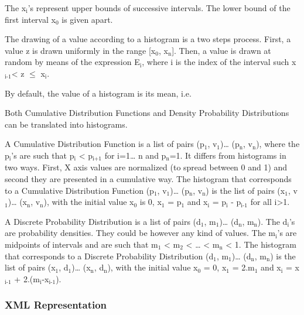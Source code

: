 \documentclass[11pt]{article}
\begin{document}
The x\(_{\text{i}}\)'s represent upper bounds of successive intervals. The lower
bound of the first interval x\(_{\text{0}}\) is given apart.

The drawing of a value according to a histogram is a two steps process.
First, a value z is drawn uniformly in the range [x\(_{\text{0}}\), x\(_{\text{n}}\)]. Then, a
value is drawn at random by means of the expression E\(_{\text{i}}\), where i is
the index of the interval such x\(_{\text{i-1}}\)< z \(\le\) x\(_{\text{i}}\).

By default, the value of a histogram is its mean, i.e.

Both Cumulative Distribution Functions and Density Probability
Distributions can be translated into histograms.

A Cumulative Distribution Function is a list of pairs (p\(_{\text{1}}\), v\(_{\text{1}}\))\ldots{}
(p\(_{\text{n}}\), v\(_{\text{n}}\)), where the p\(_{\text{i}}\)'s are such that p\(_{\text{i}}\) < p\(_{\text{i+1}}\) for
i=1\ldots{} n and p\(_{\text{n}}\)=1. It differs from histograms in two ways. First, X
axis values are normalized (to spread between 0 and 1) and second they
are presented in a cumulative way. The histogram that corresponds to a
Cumulative Distribution Function (p\(_{\text{1}}\), v\(_{\text{1}}\))\ldots{} (p\(_{\text{n}}\), v\(_{\text{n}}\)) is the
list of pairs (x\(_{\text{1}}\), v\(_{\text{1}}\))\ldots{} (x\(_{\text{n}}\), v\(_{\text{n}}\)), with the initial value
x\(_{\text{0}}\) is 0, x\(_{\text{1}}\) = p\(_{\text{1}}\) and x\(_{\text{i}}\) = p\(_{\text{i}}\) - p\(_{\text{i-1}}\) for all i>1.

A Discrete Probability Distribution is a list of pairs (d\(_{\text{1}}\), m\(_{\text{1}}\))\ldots{}
(d\(_{\text{n}}\), m\(_{\text{n}}\)). The d\(_{\text{i}}\)'s are probability densities. They could be
however any kind of values. The m\(_{\text{i}}\)'s are midpoints of intervals and
are such that m\(_{\text{1}}\) < m\(_{\text{2}}\) < \ldots{} < m\(_{\text{n}}\) < 1. The histogram that
corresponds to a Discrete Probability Distribution (d\(_{\text{1}}\), m\(_{\text{1}}\))\ldots{}
(d\(_{\text{n}}\), m\(_{\text{n}}\)) is the list of pairs (x\(_{\text{1}}\), d\(_{\text{1}}\))\ldots{} (x\(_{\text{n}}\), d\(_{\text{n}}\)),
with the initial value x\(_{\text{0}}\) = 0, x\(_{\text{1}}\) = 2.m\(_{\text{1}}\) and x\(_{\text{i}}\) = x\(_{\text{i-1}}\) +
2.(m\(_{\text{i}}\)-x\(_{\text{i-1}}\)).

\subsubsection{XML Representation}
\label{sec:orgb5abc78}
\end{document}
